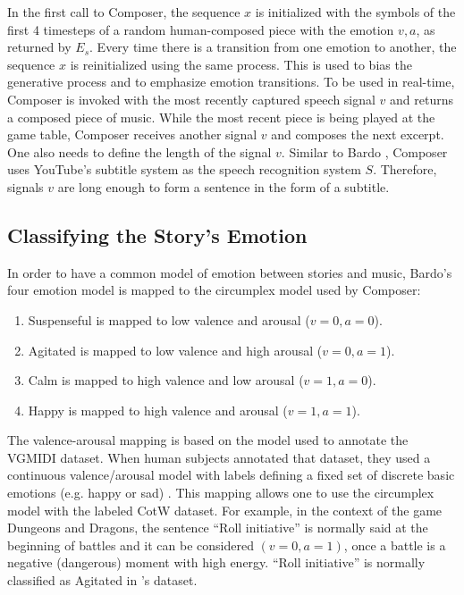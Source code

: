 In the first call to Composer, the sequence $x$ is initialized with the symbols of the first 4 timesteps of a random human-composed piece with the emotion $v, a$, as returned by $E_s$. Every time there is a transition from one emotion to another, the sequence $x$ is reinitialized using the same process. This is used to bias the generative process and to emphasize emotion transitions. To be used in real-time, Composer is invoked with the most recently captured speech signal $v$ and returns a composed piece of music. While the most recent piece is being played at the game table, Composer receives another signal $v$ and composes the next excerpt. One also needs to define the length of the signal $v$. Similar to Bardo \citet{padovani2017}, Composer uses YouTube's subtitle system as the speech recognition system $S$. Therefore, signals $v$ are long enough to form a sentence in the form of a subtitle.

\subsection{Classifying the Story's Emotion}

In order to have a common model of emotion between stories and music, Bardo's four emotion model is mapped to the circumplex model used by Composer:

\begin{enumerate}
    \item Suspenseful is mapped to low valence and arousal ($v = 0, a = 0$).
    \item Agitated is mapped to low valence and high arousal ($v = 0, a = 1$).
    \item Calm is mapped to high valence and low arousal ($v = 1, a = 0$).
    \item Happy is mapped to high valence and arousal ($v = 1, a = 1$).
\end{enumerate}

The valence-arousal mapping is based on the model used to annotate the VGMIDI dataset. When human subjects annotated that dataset, they used a continuous valence/arousal model with labels defining a fixed set of discrete basic emotions (e.g. happy or sad) \cite{ferreira_2019}. This mapping allows one to use the circumplex model with the labeled CotW dataset. For example, in the context of the game Dungeons and Dragons, the sentence ``Roll initiative'' is normally said at the beginning of battles and it can be considered $(v = 0, a = 1)$, once a battle is a negative (dangerous) moment with high energy. ``Roll initiative'' is normally classified as Agitated in \citet{padovani2017}'s dataset.

